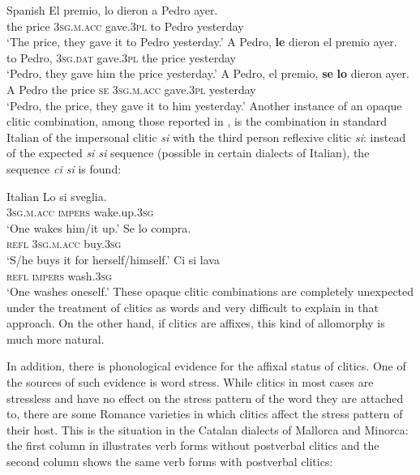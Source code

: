 \documentclass[output=paper,hidelinks]{langscibook}
\begin{document}
\ea\label{ex:Romance:3}Spanish \citep[608]{Bonet1995}
\ea\label{ex:Romance:3a}
\gll
El premio, lo dieron a Pedro ayer.\\
the price 3\textsc{sg.m.acc} gave.\textsc{3pl} to Pedro yesterday\\
\glt   `The price, they gave it to Pedro yesterday.'
\ex\label{ex:Romance:3b}
\gll
A Pedro, \textbf{le} dieron el premio ayer.\\
to Pedro, 3\textsc{sg.dat} gave.\textsc{3pl} the price yesterday\\
\glt   `Pedro, they gave him the price yesterday.'
\ex\label{ex:Romance:3c}
\gll
A Pedro, el premio, \textbf{se} \textbf{lo} dieron ayer.\\
A Pedro the price \textsc{se} 3\textsc{sg.m.acc} gave.\textsc{3pl} yesterday\\
\glt   `Pedro, the price, they gave it to him yesterday.'
\z\z
Another instance of an opaque clitic combination, among those reported in \citet{Bonet1995}, is the combination in standard Italian of the impersonal clitic \textit{si} with the third person reflexive clitic \textit{si}: instead of the expected \textit{si si} sequence (possible in certain dialects of Italian), the sequence \textit{ci si} is found:

\ea\label{ex:Romance:4} Italian \citep[609]{Bonet1995}
\ea\label{ex:Romance:4a}
\gll Lo si sveglia.\\
3\textsc{sg.m.acc} \textsc{impers} wake.up.\textsc{3sg}\\
\glt   `One wakes him/it up.'
\ex\label{ex:Romance:4b}
\gll Se lo compra.\\
\textsc{refl} 3\textsc{sg.m.acc} buy.\textsc{3sg}\\
\glt   `S/he buys it for herself/himself.'
\ex\label{ex:Romance:4c}
\gll Ci si lava\\
\textsc{refl} \textsc{impers} wash.\textsc{3sg}\\
\glt   `One washes oneself.'
\z\z
These opaque clitic combinations are completely unexpected under the treatment of clitics as words and very difficult to explain in that approach. On the other hand, if clitics are affixes, this kind of allomorphy is much more natural.

In addition, there is phonological evidence for the affixal status of clitics. One of the sources of such evidence is word stress. While clitics in most cases are stressless and have no effect on the stress pattern of the word they are attached to, there are some Romance varieties in which clitics affect the stress pattern of their host. This is the situation in the Catalan dialects of Mallorca and Minorca: the first column in  illustrates verb forms without postverbal clitics and the second column shows the same verb forms with postverbal clitics:
\end{document}
